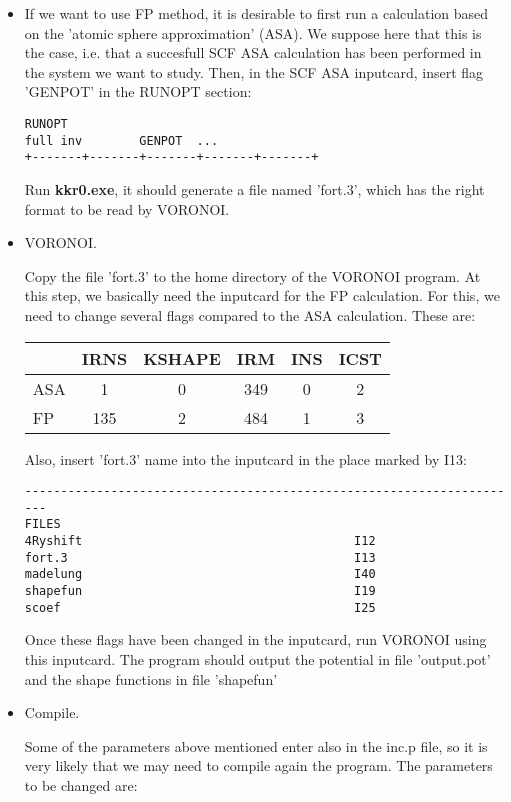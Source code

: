 \documentclass[a4paper,10pt,fullpage]{report}
\begin{document}
\begin{itemize}

\item If we want to use FP method, it is desirable to first run a calculation based on
the 'atomic sphere approximation' (ASA). We suppose here that 
this is the case, i.e. that a succesfull SCF ASA calculation has been
performed in the system we want to study. Then, in the 
SCF ASA inputcard, insert flag 'GENPOT' in the RUNOPT section:
\begin{verbatim}
RUNOPT
full inv        GENPOT  ...
+-------+-------+-------+-------+-------+
\end{verbatim}

 
Run \textbf{kkr0.exe}, it should generate a file named
'fort.3', which has the right format to be read by VORONOI. 

\item  VORONOI. 

Copy the file 'fort.3' to the home directory of the VORONOI program. 
At this step, we basically need the inputcard for the FP calculation.
For this, we need to change several flags compared to the ASA calculation.
These are:

\begin{tabular}{ l | c | c |  c | c | c}
      & IRNS & KSHAPE & IRM & INS & ICST \\
  \hline    
  ASA & 1 & 0 & 349 & 0 & 2 \\
  FP  & 135 & 2 & 484 & 1 & 3 \\
\end{tabular}

Also, insert 'fort.3' name into the inputcard in the place marked 
by I13:
\begin{verbatim}
----------------------------------------------------------------------
FILES
4Ryshift                                      I12
fort.3                                        I13
madelung                                      I40
shapefun                                      I19
scoef                                         I25
\end{verbatim}

Once these flags have been changed in the inputcard, 
run VORONOI using this inputcard. The program should output the potential
in file 'output.pot' and the shape functions in file 'shapefun'


\item Compile.

Some of the parameters above mentioned enter also in the inc.p file, so
it is very likely that we may need to compile again the program. The
parameters to be changed are:


\end{itemize}
\end{document}
